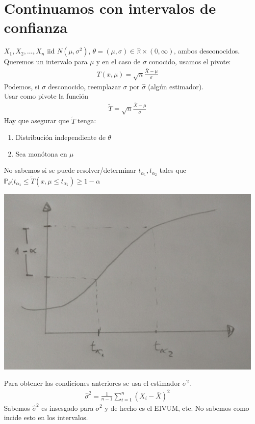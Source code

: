 \documentclass[10pt]{article}
\theoremstyle{plain}
\theoremstyle{definition}
\begin{document}
\section{Continuamos con intervalos de confianza}
$X_{1},X_{2},\ldots,X_{n}$ iid $N(\mu,\sigma^2)$, $\theta = (\mu,\sigma) \in \mathbb{R}\times(0,\infty)$, ambos desconocidos. Queremos un intervalo para $\mu$ y en el caso de $\sigma$ conocido, usamos el pivote:
\begin{align*}
T(x,\mu) = \sqrt{n} \frac{\bar{X}-\mu}{\sigma}
\end{align*}
Podemos, si $\sigma$ desconocido, reemplazar $\sigma$ por $\hat{\sigma}$ (algún estimador).\\
Usar como pivote la función
\begin{align*}
\tilde{T} = \sqrt{n} \frac{\bar{X}-\mu}{\hat{\sigma}}
\end{align*}
Hay que asegurar que $\tilde{T}$ tenga:
\begin{enumerate}
\item Distribución independiente de $\theta$
\item Sea monótona en $\mu$
\end{enumerate}
No sabemos si se puede resolver/determinar $t_{\alpha_{1}}, t_{\alpha_{2}}$ tales que $\mathbb{P}_{\theta}(t_{\alpha_{1}}\le \tilde{T}(x,\mu\le t_{\alpha_{2}})\ge 1-\alpha$
\begin{center}
\includegraphics[scale=0.2]{imagenes/distr1.jpg}
\end{center}
Para obtener las condiciones anteriores se usa el estimador $\sigma^2$.
\begin{align*}
\hat{\sigma}^2 = \frac{1}{n-1}\sum_{i=1}^n {(X_{i}-\bar{X})^2}
\end{align*}
Sabemos $\hat{\sigma}^2$ es insesgado para $\sigma^2$ y de hecho es el EIVUM, etc. No sabemos como incide esto en los intervalos.\\
\end{document}
